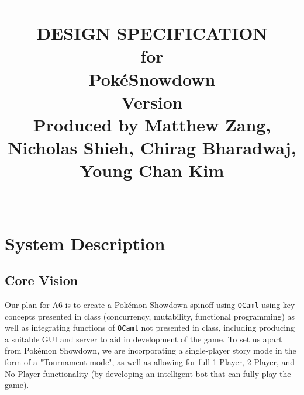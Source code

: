 \documentclass{scrreprt}
\title{%
\flushleft
\rule{16cm}{5pt}\vskip1cm
\Huge{DESIGN SPECIFICATION}\\
for\\
Pok\'eSnowdown \\
\vspace{2cm}
\LARGE{Version \myversion\\}
\vspace{2cm}
Produced by Matthew Zang, Nicholas Shieh, Chirag Bharadwaj, Young Chan Kim\\
\vfill
\rule{16cm}{5pt}
}
\date{}
\begin{document}
\maketitle
\tableofcontents
\restoregeometry
 
\section{System Description}
\subsection{Core Vision}

Our plan for A6 is to create a Pok\'emon Showdown spinoff using \texttt{OCaml} using key concepts presented in class (concurrency, mutability, functional programming) as well as integrating functions of \texttt{OCaml} not presented in class, including producing a suitable GUI and server to aid in development of the game. To set us apart from Pok\'emon Showdown, we are incorporating a single-player story mode in the form of a "Tournament mode", as well as allowing for full 1-Player, 2-Player, and No-Player functionality (by developing an intelligent bot that can fully play the game).
\end{document}
